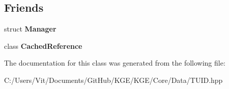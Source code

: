 \subsection*{Friends}
\begin{DoxyCompactItemize}
\item 
\hypertarget{class_k_g_e_1_1_t_u_i_d_a1fd6b9bc3f72bb2b64e602de3982929d}{struct {\bfseries Manager}}\label{class_k_g_e_1_1_t_u_i_d_a1fd6b9bc3f72bb2b64e602de3982929d}

\item 
\hypertarget{class_k_g_e_1_1_t_u_i_d_abae691ad248b86e85d4bc04709d2f39e}{class {\bfseries Cached\-Reference}}\label{class_k_g_e_1_1_t_u_i_d_abae691ad248b86e85d4bc04709d2f39e}

\end{DoxyCompactItemize}


The documentation for this class was generated from the following file\-:\begin{DoxyCompactItemize}
\item 
C\-:/\-Users/\-Vit/\-Documents/\-Git\-Hub/\-K\-G\-E/\-K\-G\-E/\-Core/\-Data/T\-U\-I\-D.\-hpp\end{DoxyCompactItemize}
